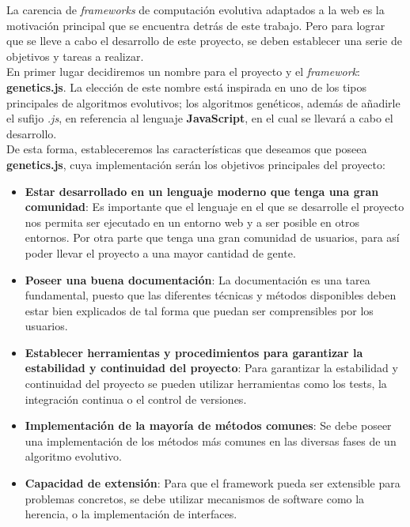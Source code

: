


La carencia de \textit{frameworks} de computación evolutiva adaptados a la web es la motivación principal que se encuentra detrás de este trabajo. Pero para lograr que se lleve a cabo el desarrollo de este proyecto, se deben establecer una serie de objetivos y tareas a realizar. \\

En primer lugar decidiremos un nombre para el proyecto y el \textit{framework}: \textbf{genetics.js}. La elección de este nombre está inspirada en uno de los tipos principales de algoritmos evolutivos; los algoritmos genéticos, además de añadirle el sufijo \textit{.js}, en referencia al lenguaje \textbf{JavaScript}, en el cual se llevará a cabo el desarrollo. \\

De esta forma, estableceremos las características que deseamos que poseea \textbf{genetics.js}, cuya implementación serán los objetivos principales del proyecto:

\begin{itemize}
    \item \textbf{Estar desarrollado en un lenguaje moderno que tenga una gran comunidad}: Es importante que el lenguaje en el que se desarrolle el proyecto nos permita ser ejecutado en un entorno web y a ser posible en otros entornos. Por otra parte que tenga una gran comunidad de usuarios, para así poder llevar el proyecto a una mayor cantidad de gente.
    \item \textbf{Poseer una buena documentación}: La documentación es una tarea fundamental, puesto que las diferentes técnicas y métodos disponibles deben estar bien explicados de tal forma que puedan ser comprensibles por los usuarios.
    \item \textbf{Establecer herramientas y procedimientos para garantizar la estabilidad y continuidad del proyecto}: Para garantizar la estabilidad y continuidad del proyecto se pueden utilizar herramientas como los tests, la integración continua o el control de versiones.
    \item \textbf{Implementación de la mayoría de métodos comunes}: Se debe poseer una implementación de los métodos más comunes en las diversas fases de un algoritmo evolutivo.
    \item \textbf{Capacidad de extensión}: Para que el framework pueda ser extensible para problemas concretos, se debe utilizar mecanismos de software como la herencia, o la implementación de interfaces.
\end{itemize}

